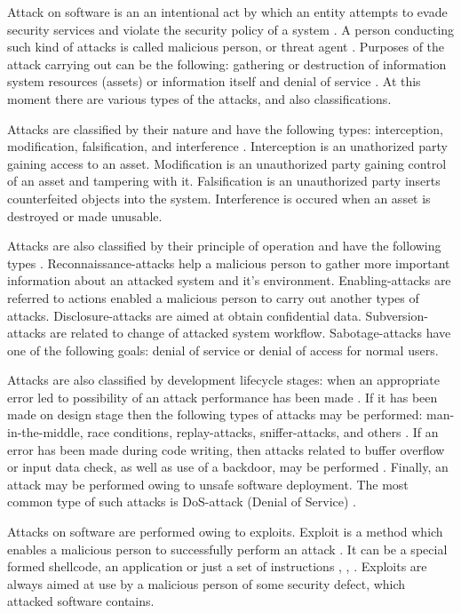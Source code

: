 %
Attack on software is an an intentional act by which an entity attempts to evade security services and violate the security policy of a system . 
%
A person conducting such kind of attacks is called malicious person, or threat agent . 
%
Purposes of the attack carrying out can be the following: gathering or destruction of information system resources (assets) or information itself and denial of service . 
%
At this moment there are various types of the attacks, and also classifications. 

%
Attacks are classified by their nature and have the following types: interception, modification, falsification, and interference . 
%
Interception is an unathorized party gaining access to an asset. 
%
Modification is an unauthorized party gaining control of an asset and tampering with it. 
%
Falsification is an unauthorized party inserts counterfeited objects into the system. 
%
Interference is occured when an asset is destroyed or made unusable. 

%
Attacks are also classified by their principle of operation and have the following types . 
%
Reconnaissance-attacks help a malicious person to gather more important information about an attacked system and it's environment. 
%
Enabling-attacks are referred to actions enabled a malicious person to carry out another types of attacks. 
%
Disclosure-attacks are aimed at obtain confidential data. 
%
Subversion-attacks are related to change of attacked system workflow. 
%
Sabotage-attacks have one of the following goals: denial of service or denial of access for normal users. 

%
Attacks are also classified by development lifecycle stages: when an appropriate error led to possibility of an attack performance has been made . 
%
If it has been made on design stage then the following types of attacks may be performed: man-in-the-middle, race conditions, replay-attacks, sniffer-attacks, and others . 
%
If an error has been made during code writing, then attacks related to buffer overflow or input data check, as well as use of a backdoor, may be performed . 
%
Finally, an attack may be performed owing to unsafe software deployment. 
%
The most common type of such attacks is DoS-attack (Denial of Service) . 

%
Attacks on software are performed owing to exploits. 
%
Exploit is a method which enables a malicious person to successfully perform an attack . 
%
It can be a special formed shellcode, an application or just a set of instructions , , . 
%
Exploits are always aimed at use by a malicious person of some security defect, which attacked software contains. 